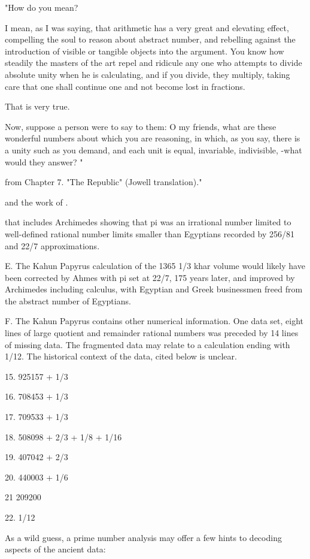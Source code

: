 \documentclass[12pt]{article}
\begin{document}
"How do you mean?

I mean, as I was saying, that arithmetic has a very great and elevating effect, compelling the soul to reason about abstract number, and rebelling against the introduction of visible or tangible objects into the argument. You know how steadily the masters of the art repel and ridicule any one who attempts to divide absolute unity when he is calculating, and if you divide, they multiply, taking care that one shall continue one and not become lost in fractions.

That is very true.

Now, suppose a person were to say to them: O my friends, what are these wonderful numbers about which you are reasoning, in which, as you say, there is a unity such as you demand, and each unit is equal, invariable, indivisible, -what would they answer? "

from Chapter 7. "The Republic" (Jowell translation)."

and the work of .

that includes Archimedes showing that pi was an irrational number limited to well-defined rational number limits smaller than Egyptians recorded by 256/81 and 22/7 approximations.

E. The Kahun Papyrus calculation of the 1365 1/3 khar volume would likely have been corrected by Ahmes with pi set at 22/7, 175 years later, and improved by Archimedes including calculus, with Egyptian and Greek businessmen freed from the abstract number of Egyptians.

F. The Kahun Papyrus contains other numerical information. One data set, eight lines of large quotient and remainder rational numbers was preceded by 14 lines of missing data. The fragmented data may relate to a calculation ending with 1/12. The historical context of the data, cited below is unclear. 

15. 925157 + 1/3 

16. 708453 + 1/3 

17. 709533 + 1/3 

18. 508098 + 2/3 + 1/8 + 1/16 

19. 407042 + 2/3 

20. 440003 + 1/6 

21 209200 

22. 1/12

As a wild guess, a prime number analysis may offer a few hints to decoding aspects of the ancient data:
\end{document}

